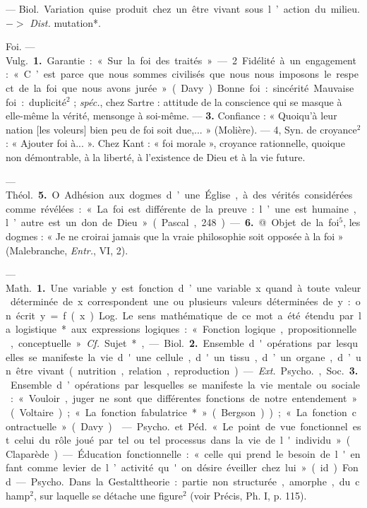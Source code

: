 \begin{itemize}[leftmargin=1cm, label=, itemsep=1pt]
 — \si{Biol.} Variation quise produit chez un être vivant sous l’action
du milieu. $->$ {\it Dist.} mutation*.

Foi. — \si{Vulg.} {\bf 1.} Garantie : « Sur la
foi des traités ». — 2 Fidélité à un
engagement : « C’est parce que nous
sommes civilisés que nous nous
imposons le respect de la foi que
nous avons jurée » (Davy). Bonne
foi : sincérité. Mauvaise foi : duplicité$^2$ ; {\it spéc.}, chez Sartre : attitude de
la conscience qui se masque à elle-même la vérité, mensonge à soi-même. — {\bf 3.} Confiance : « Quoiqu’à leur nation [les voleurs] bien
peu de foi soit due,... » (Molière).
— 4, Syn. de croyance$^2$ : « Ajouter
foi à... ». Chez Kant : « foi morale »,
croyance rationnelle, quoique non
démontrable, à la liberté, à l’existence de Dieu et à la vie future.

— \si{Théol.} {\bf 5.} O. Adhésion aux
dogmes d’une Église, à des vérités
considérées comme révélées : « La
foi est différente de la preuve : l’une
est humaine, l’autre est un don de
Dieu » (Pascal, 248). — {\bf 6.} @ Objet
de la foi$^5$, les dogmes : « Je ne croirai
jamais que la vraie philosophie soit
opposée à la foi » (Malebranche,
{\it Entr.}, VI, 2).

 — \si{Math.} {\bf 1.} Une variable

y est fonction d’une variable x quand
à toute valeur déterminée de x correspondent une ou plusieurs valeurs
déterminées de y : on écrit y = f(x).
\si{Log.} Le sens mathématique de ce
mot a été étendu par la logistique*
aux expressions logiques : « Fonction logique, propositionnelle, conceptuelle. » {\it Cf.} Sujet*,

— \si{Biol.} {\bf 2.} Ensemble d'opérations
par lesquelles se manifeste la vie
d'une cellule, d'un tissu, d’un organe, d’un être vivant (nutrition,
relation, reproduction). — {\it Ext.}
\si{Psycho.}, \si{Soc.} {\bf 3.} Ensemble d’opérations par lesquelles se manifeste la
vie mentale ou sociale : « Vouloir,
juger ne sont que différentes fonctions de notre entendement » (Voltaire); « La fonction fabulatrice* »
(Bergson)); « La fonction contractuelle » (Davy).

 — \si{Psycho.} et \si{Péd.} « Le
point de vue fonctionnel est celui
du rôle joué par tel ou tel processus
dans la vie de l'individu » (Claparède). — Éducation fonctionnelle :
« celle qui prend le besoin de l'enfant
comme levier de l’activité qu'on
désire éveiller chez lui » (id.).

Fond. — \si{Psycho.} Dans la Gestalttheorie : partie non structurée,
amorphe, du champ$^2$, sur laquelle
se détache une figure$^2$ (voir Précis,
Ph. I, p. 115).


\end{itemize}
